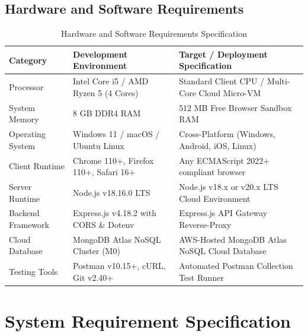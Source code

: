 \documentclass[12pt,a4paper,oneside]{report}
\begin{document}
\section{Hardware and Software Requirements}
\begin{table}[H]
\centering
\small
\caption{Hardware and Software Requirements Specification}
\label{tab:hw_sw}
\begin{tabularx}{\textwidth}{lXX}
\toprule
\textbf{Category} & \textbf{Development Environment} & \textbf{Target / Deployment Specification} \\
\midrule
Processor & Intel Core i5 / AMD Ryzen 5 (4 Cores) & Standard Client CPU / Multi-Core Cloud Micro-VM \\
System Memory & 8 GB DDR4 RAM & 512 MB Free Browser Sandbox RAM \\
Operating System & Windows 11 / macOS / Ubuntu Linux & Cross-Platform (Windows, Android, iOS, Linux) \\
Client Runtime & Chrome 110+, Firefox 110+, Safari 16+ & Any ECMAScript 2022+ compliant browser \\
Server Runtime & Node.js v18.16.0 LTS & Node.js v18.x or v20.x LTS Cloud Environment \\
Backend Framework & Express.js v4.18.2 with CORS \& Dotenv & Express.js API Gateway Reverse-Proxy \\
Cloud Database & MongoDB Atlas NoSQL Cluster (M0) & AWS-Hosted MongoDB Atlas NoSQL Cloud Database \\
Testing Tools & Postman v10.15+, cURL, Git v2.40+ & Automated Postman Collection Test Runner \\
\bottomrule
\end{tabularx}
\end{table}

\chapter{System Requirement Specification}
\end{document}
